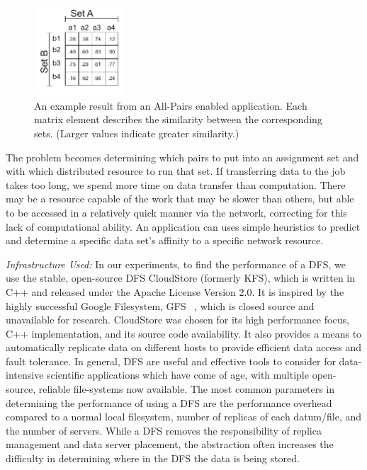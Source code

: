\documentclass{rspublic}
\begin{document}
\begin{figure}[!ht]
 \begin{center}
     \includegraphics[width=0.3\textwidth]{data/allpairs-exp.pdf}
\end{center}
\caption{\small An example result from an All-Pairs enabled application.
Each matrix element describes the similarity between the corresponding
sets. (Larger values indicate greater similarity.)}
 \label{Fig:AllPairsExplanation}
\end{figure}

The problem becomes determining which pairs to put into an assignment
set and with which distributed resource to run that set.  If
transferring data to the job takes too long, we spend more time on
data transfer than computation. There may be a resource capable of the
work that may be slower than others, but able to be accessed in a
relatively quick manner via the network, correcting for this lack of
computational ability. An application can uses simple heuristics to
predict and determine a specific data set's affinity to a specific
network resource.


{\it Infrastructure Used: } In our experiments, to find the
performance of a DFS, we use the stable, open-source DFS CloudStore
(formerly KFS), which is written in C++ and released under the Apache
License Version 2.0. It is inspired by the highly successful Google
Filesystem, GFS ~\citep{cloudstore_web}, which is closed source and
unavailable for research. CloudStore was chosen for its high
performance focus, C++ implementation, and its source code
availability. It also provides a means to automatically replicate data
on different hosts to provide efficient data access and fault
tolerance. In general, DFS are useful and effective tools to consider
for data-intensive scientific applications which have come of age,
with multiple open-source, reliable file-systems now available.  The
most common parameters in determining the performance of using a DFS
are the performance overhead compared to a normal local filesystem,
number of replicas of each datum/file, and the number of servers.
While a DFS removes the responsibility of replica management and data
server placement, the abstraction often increases the difficulty in
determining where in the DFS the data is being stored.
\end{document}
